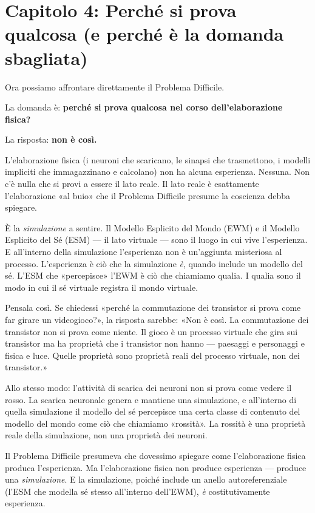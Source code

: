 \documentclass[11pt, twoside, openright]{book}
\begin{document}
\chapter*{Capitolo 4: Perché si prova qualcosa (e perché è la domanda sbagliata)}

Ora possiamo affrontare direttamente il Problema Difficile.

La domanda è: \textbf{perché si prova qualcosa nel corso dell'elaborazione fisica?}

La risposta: \textbf{non è così.}

L'elaborazione fisica (i neuroni che scaricano, le sinapsi che trasmettono, i modelli impliciti che immagazzinano e calcolano) non ha alcuna esperienza. Nessuna. Non c'è nulla che si provi a essere il lato reale. Il lato reale è esattamente l'elaborazione «al buio» che il Problema Difficile presume la coscienza debba spiegare.

È la \textit{simulazione} a sentire. Il Modello Esplicito del Mondo (EWM) e il Modello Esplicito del Sé (ESM) --- il lato virtuale --- sono il luogo in cui vive l'esperienza. E all'interno della simulazione l'esperienza non è un'aggiunta misteriosa al processo. L'esperienza è ciò che la simulazione \textit{è}, quando include un modello del sé. L'ESM che «percepisce» l'EWM è ciò che chiamiamo qualia. I qualia sono il modo in cui il sé virtuale registra il mondo virtuale.

Pensala così. Se chiedessi «perché la commutazione dei transistor si prova come far girare un videogioco?», la risposta sarebbe: «Non è così. La commutazione dei transistor non si prova come niente. Il gioco è un processo virtuale che gira sui transistor ma ha proprietà che i transistor non hanno --- paesaggi e personaggi e fisica e luce. Quelle proprietà sono proprietà reali del processo virtuale, non dei transistor.»

Allo stesso modo: l'attività di scarica dei neuroni non si prova come vedere il rosso. La scarica neuronale genera e mantiene una simulazione, e all'interno di quella simulazione il modello del sé percepisce una certa classe di contenuto del modello del mondo come ciò che chiamiamo «rossità». La rossità è una proprietà reale della simulazione, non una proprietà dei neuroni.

Il Problema Difficile presumeva che dovessimo spiegare come l'elaborazione fisica produca l'esperienza. Ma l'elaborazione fisica non produce esperienza --- produce una \textit{simulazione}. E la simulazione, poiché include un anello autoreferenziale (l'ESM che modella sé stesso all'interno dell'EWM), \textit{è} costitutivamente esperienza.
\end{document}
